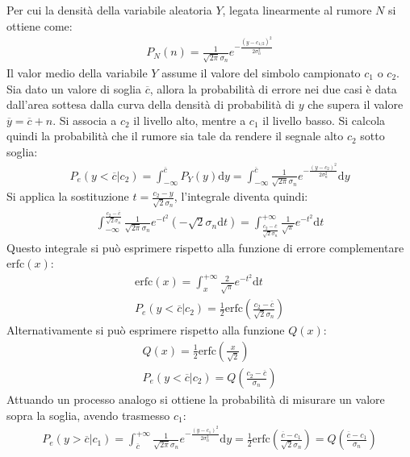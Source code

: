 \documentclass{article}
\newcommand{\df}{\mathrm{d}}
\numberwithin{equation}{subsection}
\begin{document}
Per cui la densità della variabile aleatoria $Y$, legata linearmente al rumore $N$ si ottiene come:
\begin{gather*}
    P_N(n)=\displaystyle\frac{1}{\sqrt{2\pi}\sigma_n}e^{-\frac{(y-c_{1/2})^2}{2\sigma_n^2}}    
\end{gather*}
Il valor medio della variabile $Y$ assume il valore del simbolo campionato $c_1$ o $c_2$. 
Sia dato un valore di soglia $\overline{c}$, allora la probabilità di errore nei due casi è data dall'area sottesa dalla curva della densità di probabilità di $y$ che 
supera il valore $\overline{y}=\overline{c}+n$. Si associa a $c_2$ il livello alto, mentre a $c_1$ il livello basso. Si calcola quindi la probabilità che il rumore sia 
tale da rendere il segnale alto $c_2$ sotto soglia:
\begin{gather*}
    P_e(y<\overline{c}|c_2)=\displaystyle\int_{-\infty}^{\overline{c}}P_Y(y)\df y=\int_{-\infty}^{\overline{c}}\frac{1}{\sqrt{2\pi}\sigma_n}e^{-\frac{(y-c_{2})^2}{2\sigma_n^2}}\df y
\end{gather*}
Si applica la sostituzione $t=\displaystyle\frac{c_2-y}{\sqrt{2}\sigma_n}$, l'integrale diventa quindi:
\begin{gather*}
    \displaystyle\int_{-\infty}^{\frac{c_2-\overline{c}}{\sqrt2\sigma_n}}\frac{1}{\sqrt{2\pi}\sigma_n}e^{-t^2}\left(-\sqrt2\sigma_n\df t\right)=\int_{\frac{c_2-\overline{c}}{\sqrt2\sigma_n}}^{+\infty}\frac{1}{\sqrt\pi}e^{-t^2}\df t
\end{gather*}
Questo integrale si può esprimere rispetto alla funzione di errore complementare $\mathrm{erfc}(x)$:
\begin{gather}
    \mathrm{erfc}(x)=\displaystyle\int_{x}^{+\infty}\frac{2}{\sqrt\pi}e^{-t^2}{\df t}\\
    P_e(y<\overline{c}|c_2)=\displaystyle\frac{1}{2}\mathrm{erfc}\left(\frac{c_2-\overline{c}}{\sqrt{2}\sigma_n}\right)
\end{gather}
Alternativamente si può esprimere rispetto alla funzione $Q(x)$:
\begin{gather}
    Q(x)=\displaystyle\frac{1}{2}\mathrm{erfc}\left(\frac{x}{\sqrt2}\right)\\
    P_e(y<\overline{c}|c_2)=Q\left(\frac{c_2-\overline{c}}{\sigma_n}\right)
\end{gather}
Attuando un processo analogo si ottiene la probabilità di misurare un valore sopra la soglia, avendo trasmesso $c_1$:
\begin{gather}
    P_e(y>\overline{c}|c_1)=\int_{\overline{c}}^{+\infty}\frac{1}{\sqrt{2\pi}\sigma_n}e^{-\frac{(y-c_1)^2}{2\sigma_n^2}}\df y=\frac{1}{2}\mathrm{erfc}\left(\frac{\overline{c}-c_1}{\sqrt{2}\sigma_n}\right)=Q\left(\frac{\overline{c}-c_1}{\sigma_n}\right)
\end{gather}
\end{document}
